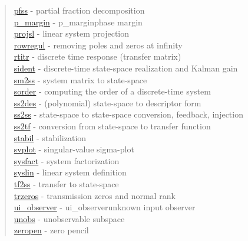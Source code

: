 \begin{quote}
\hyperlink{pfss}{pfss} - {partial fraction decomposition} \\  
\hyperlink{p_margin}{p\_margin} - {p_margin}{phase margin} \\  
\hyperlink{projsl}{projsl} - {linear system projection} \\  
\hyperlink{rowregul}{rowregul} - {removing poles and zeros at infinity} \\  
\hyperlink{rtitr}{rtitr} - {discrete time response (transfer matrix)  } \\  
\hyperlink{sident}{sident} - {discrete-time state-space realization and Kalman gain} \\  
\hyperlink{sm2ss}{sm2ss} - {system matrix to state-space} \\  
\hyperlink{sorder}{sorder} - {computing the order of a discrete-time system} \\  
\hyperlink{ss2des}{ss2des} - {(polynomial) state-space to descriptor form} \\  
\hyperlink{ss2ss}{ss2ss} - {state-space to state-space conversion, feedback, injection} \\  
\hyperlink{ss2tf}{ss2tf} - {conversion from state-space to transfer function} \\  
\hyperlink{stabil}{stabil} - {stabilization} \\  
\hyperlink{svplot}{svplot} - {singular-value sigma-plot} \\  
\hyperlink{sysfact}{sysfact} - {system factorization} \\  
\hyperlink{syslin}{syslin} - {linear system definition} \\  
\hyperlink{tf2ss}{tf2ss} - {transfer to state-space} \\  
\hyperlink{trzeros}{trzeros} - {transmission zeros and normal rank} \\  
\hyperlink{ui_observer}{ui\_observer} - {ui_observer}{unknown input observer} \\  
\hyperlink{unobs}{unobs} - {unobservable subspace} \\  
\hyperlink{zeropen}{zeropen} - {zero pencil}
\end{quote}

